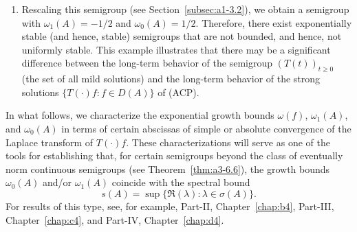 \begin{example}
\begin{enumerate}[\upshape (i), wide, labelindent=.25em]
To see this, consider $E \coloneq C_0(\R_{+}) \cap $ $L^{1}(\R_{+},\eu^{x}\dx)$. 
Then, as shown in Example~\ref{ex:a3-1.3} 
the translation semigroup satisfies $\|T(t)\| = 1$, and hence $\omega_{0}(A) = 0$. 
For every $\lambda \in \C$ with $\Re(\lambda) > -1$ and every $f \in E$, the resolvent of the generator is given as $R(\lambda,A)f = \int_{0}^{\infty} \eu^{\lambda t} T(t)f  \dt$.
From Eq.~, it follows that
\[
T(t)f = \eu^{\lambda t}\left(f - \int_{0}^{t} \eu^{-\lambda s} T(s) (\lambda - A)f  \ds\right),
\]
and from the existence of the limit
\[
\lim_{t \to \infty} \int_{0}^{t} \eu^{-\lambda s} T(s) (\lambda - A)f  \ds,
\] 
it follows that 
$\|T(t)f\| \leq M\eu^{\lambda t}$ for every $f \in D(A)$ and some constant $M$ depending on $f$. This yields $\omega_{1}(A)  \leq -1 < 0 = \omega_{0}(A)$. 
Thus, we have a semigroup that is exponentially stable, but not uniformly exponentially stable.

\item
Rescaling this semigroup (see Section~\ref{subsec:a1-3.2}), we obtain a semigroup with $\omega_{1}(A) = -1/2 $ and $\omega_{0}(A) = 1/2 $.
Therefore, there exist exponentially stable (and hence, stable) semigroups that are not bounded, and hence, not uniformly stable.
This example illustrates that there may be a significant difference between the long-term behavior of the semigroup $(T(t))_{t \geq 0}$ (\ie the set of all mild solutions) and the long-term behavior of the strong solutions $\{T(\cdot)f \colon f \in D(A)\}$ of (ACP). 
\end{enumerate}
\end{example}
In what follows, we characterize the exponential growth bounds $\omega(f)$, $\omega_{1}(A)$, and $\omega_{0}(A)$ in terms of certain abscissas of simple or absolute convergence of the Laplace transform of\/ $T(\cdot)f$. 
These characterizations will serve as one of the tools for 
establishing that, for certain semigroups beyond the class of eventually norm continuous semigroups (see Theorem~\ref{thm:a3-6.6}), the growth bounds $\omega_{0}(A)$ and/or $\omega_{1}(A)$ coincide with the spectral bound %
\[
	s(A) = \sup\{\Re(\lambda)\colon\lambda \in \sigma(A)\} .
\]
%
For results of this type, see, for example, Part-II, Chapter~\ref{chap:b4},  Part-III, Chapter~\ref{chap:c4},  and Part-IV, Chapter~\ref{chap:d4}.


